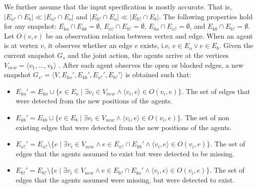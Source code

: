 \documentclass[letterpaper]{article} %
\def\
UrlFont{\rm}  %
\newcommand{\eo}{E_{o}} %
\newcommand{\eb}{E_{b}} %
\newcommand{\eko}{E_{ko}} %
\newcommand{\ekb}{E_{kb}} %
\newcommand{\eao}{E_{o?}} %
\newcommand{\eab}{E_{b?}} %
\theoremstyle{definition}
\begin{document}
We further assume that the input specification is mostly accurate. That is, $| \eao \cap E_b | \ll |\eao \cap E_o|$ and $| \eab \cap E_o | \ll |\eab \cap E_b|$.
The following properties hold for any snapshot:
$\eko \cap \ekb = \emptyset$, $\eao \cap \eab = \emptyset$, $\eko \cap \eao = \emptyset$, and $\ekb \cap \eab = \emptyset$.
Let $O(v, e)$ be an observation relation between vertex and edge. When an agent is at vertex $v$, it observes whether an edge $e$ exists, i.e, $e \in \eo \lor e \in \eb$. Given the current snapshot $G_s$ and the joint action, the agents arrive at the vertices $V_{new}= \langle v_1, \dots, v_k \rangle$ . After each agent observes the open or blocked edges, a new snapshot $G_{s'} = \langle V, \eko', \ekb', \eao', \eab' \rangle $ is obtained such that:
\begin{itemize}
    \item $\eko' = \eko \cup \{e \in \eo \mid \exists v_i \in V_{new} \land \langle v_i, e \rangle \in O(v_i, e)\}$. The set of  edges that were detected from the new positions of the agents.
    \item $\ekb' = \ekb \cup \{e \in \eb \mid \exists v_i \in V_{new} \land \langle v_i, e \rangle \in O(v_i, e)\}$. The set of non existing edges that were detected from the new positions of the agents.
    \item $\eao' = \eao \setminus \{e \mid \exists v_i \in V_{new} \land e \in \eao \cap \ekb' \land \langle v_i, e \rangle \in O(v_i,e)\}$. The set of  edges that the agents assumed to exist but were detected to be missing.
    \item $\eab' = \eab \setminus \{e \mid \exists v_i \in V_{new} \land e \in \eab \cap \eko' \land \langle v_i, e \rangle \in O(v_i,e)\}$. The set of  edges that the agents assumed were missing, but were detected to exist.
\end{itemize}
\end{document}
